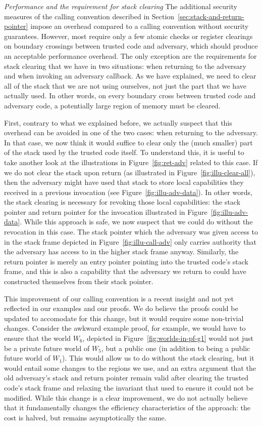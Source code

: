 \documentclass[format=acmsmall, review=true, screen=true]{acmart}
\renewcommand{\sectionname}{Section}
\begin{document}
\emph{Performance and the requirement for stack clearing} The additional
security measures of the calling convention described in
\sectionname~\ref{sec:stack-and-return-pointer} impose an overhead compared to a
calling convention without security guarantees. However, most require only a few
atomic checks or register clearings on boundary crossings between trusted code
and adversary, which should produce an acceptable performance overhead. The only
exception are the requirements for stack clearing that we have in two
situations: when returning to the adversary and when invoking an adversary
callback. As we have explained, we need to clear all of the stack that we are
not using ourselves, not just the part that we have actually used. In other
words, on every boundary cross between trusted code and adversary code, a
potentially large region of memory must be cleared.

First, contrary to what we explained before, we actually suspect that this overhead can be avoided in one of the two cases: when returning to the adversary.
In that case, we now think it would suffice to clear only the (much smaller) part of the stack used by the trusted code itself.
To understand this, it is useful to take another look at the illustrations in Figure~\ref{fig:ret-adv} related to this case.
If we do not clear the stack upon return (as illustrated in Figure~\ref{fig:illu-clear-all}), then the adversary might have used that stack to store local capabilities they received in a previous invocation (see Figure~\ref{fig:illu-adv-data}).
In other words, the stack clearing is necessary for revoking those local capabilities: the stack pointer and return pointer for the invocation illustrated in Figure~\ref{fig:illu-adv-data}.
While this approach is safe, we now suspect that we could do without the revocation in this case.
The stack pointer which the adversary was given access to in the stack frame depicted in Figure~\ref{fig:illu-call-adv} only carries authority that the adversary has access to in the higher stack frame anyway.
Similarly, the return pointer is merely an entry pointer pointing into the trusted code's stack frame, and this is also a capability that the adversary we return to could have constructed themselves from their stack pointer.

This improvement of our calling convention is a recent insight and not yet reflected in our examples and our proofs.
We do believe the proofs could be updated to accomodate for this change, but it would require some non-trivial changes.
Consider the awkward example proof, for example, we would have to ensure that the world $W_6$, depicted in Figure~\ref{fig:worlds-in-pf-g1} would not just be a private future world of $W_5$, but a public one (in addition to being a public future world of $W_1$).
This would allow us to do without the stack clearing, but it would entail some changes to the regions we use, and an extra argument that the old adversary's stack and return pointer remain valid after clearing the trusted code's stack frame and relaxing the invariant that used to ensure it could not be modified.
While this change is a clear improvement, we do not actually believe that it fundamentally changes the efficiency characteristics of the approach: the cost is halved, but remains asymptotically the same.
\end{document}

